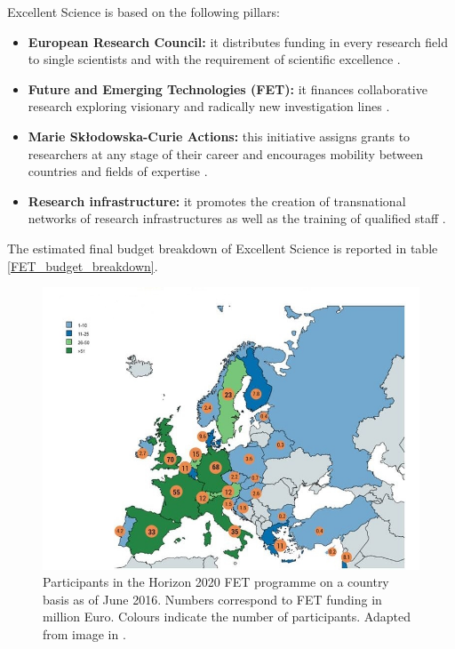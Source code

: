 Excellent Science is based on the following pillars: 

\begin{itemize}
 \item \textbf{European Research Council:} it distributes funding in every research field to single scientists and with the requirement of scientific excellence \cite{ERC}.  
 \item \textbf{Future and Emerging Technologies (FET):} it finances collaborative research exploring visionary and radically new investigation lines \cite{FET}. 
 \item \textbf{Marie Sk\l{}odowska-Curie Actions:} this initiative assigns grants to researchers at any stage of their career and encourages mobility between countries and fields of expertise \cite{MSCA}. 
 \item \textbf{Research infrastructure:} it promotes the creation of transnational networks of research infrastructures as well as the training of qualified staff \cite{ResearchInfrastructure}. 
\end{itemize}
The estimated final budget breakdown of Excellent Science is reported in table \ref{FET_budget_breakdown}.

\begin{figure}[!t] 
 \begin{center}
 \includegraphics[scale=0.3]{Images/Country_participation_in_H2020_FET_projects.jpg}
 \caption{Participants in the Horizon 2020 FET programme on a country basis as of June 2016. Numbers correspond to FET funding in million Euro. Colours indicate the number of participants. Adapted from image in \cite{FETParticipation}.}
 \label{Country_participation_in_H2020_FET_projects}
 \end{center}
\end{figure}


